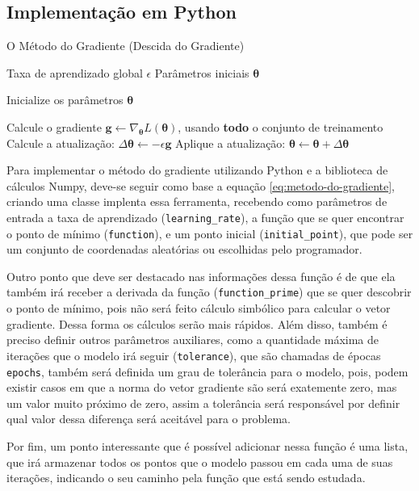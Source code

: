 \subsection{Implementação em Python}

\begin{algorithm}[H]
\caption{O Método do Gradiente (Descida do Gradiente)}
\label{alg:gradient_descent}
\begin{algorithmic}[1]
\Require Taxa de aprendizado global $\epsilon$
\Require Parâmetros iniciais $\boldsymbol{\theta}$

\State Inicialize os parâmetros $\boldsymbol{\theta}$

    \State Calcule o gradiente $\mathbf{g} \gets \nabla_{\boldsymbol{\theta}} L(\boldsymbol{\theta})$, usando \textbf{todo} o conjunto de treinamento
    \State Calcule a atualização: $\Delta \boldsymbol{\theta} \gets -\epsilon \mathbf{g}$
    \State Aplique a atualização: $\boldsymbol{\theta} \gets \boldsymbol{\theta} + \Delta \boldsymbol{\theta}$
\EndWhile
\end{algorithmic}
\end{algorithm}

Para implementar o método do gradiente utilizando Python e a biblioteca de cálculos Numpy, deve-se seguir como base a equação \ref{eq:metodo-do-gradiente}, criando uma classe implenta essa ferramenta, recebendo como parâmetros de entrada a taxa de aprendizado (\texttt{learning\_rate}), a função que se quer encontrar o ponto de mínimo (\texttt{function}), e um ponto inicial (\texttt{initial\_point}), que pode ser um conjunto de coordenadas aleatórias ou escolhidas pelo programador.

Outro ponto que deve ser destacado nas informações dessa função é de que ela também irá receber a derivada da função (\texttt{function\_prime}) que se quer descobrir o ponto de mínimo, pois não será feito cálculo simbólico para calcular o vetor gradiente. Dessa forma os cálculos serão mais rápidos. Além disso, também é preciso definir outros parâmetros auxiliares, como a quantidade máxima de iterações que o modelo irá seguir (\texttt{tolerance}), que são chamadas de épocas \texttt{epochs}, também será definida um grau de tolerância para o modelo, pois, podem existir casos em que a norma do vetor gradiente são será exatemente zero, mas um valor muito próximo de zero, assim a tolerância será responsável por definir qual valor dessa diferença será aceitável para o problema.

Por fim, um ponto interessante que é possível adicionar nessa função é uma lista, que irá armazenar todos os pontos que o modelo passou em cada uma de suas iterações, indicando o seu caminho pela função que está sendo estudada.

